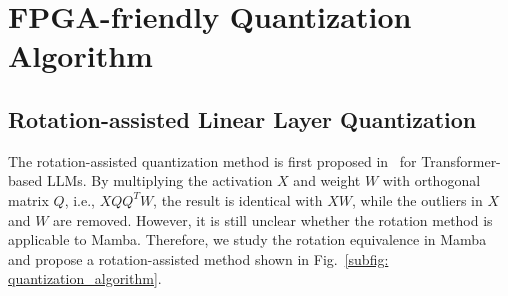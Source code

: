 \section{FPGA-friendly Quantization Algorithm}
\label{sec:quantization_algo}




\subsection{Rotation-assisted Linear Layer Quantization}

The rotation-assisted quantization method is first proposed in~\cite{ashkboos2024quarot}
for Transformer-based LLMs.
By multiplying the activation $X$ and weight $W$ with orthogonal matrix $Q$, i.e., $XQQ^TW$,
the result is identical with $XW$,
while the outliers in $X$ and $W$ are removed.
However, it is still unclear whether the rotation method is applicable to Mamba.
Therefore, we study the rotation equivalence in Mamba and propose a rotation-assisted method shown in Fig.~\ref{subfig: quantization_algorithm}.




